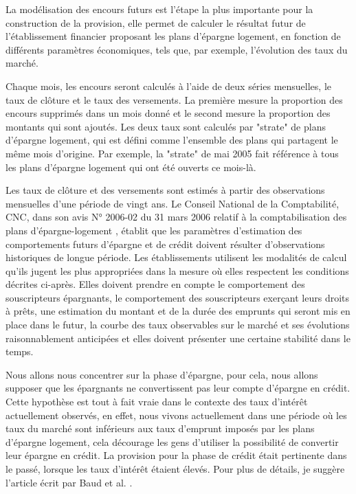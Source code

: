 \documentclass[12pt, a4paper]{book}
\begin{document}
La modélisation des encours futurs est l'étape la plus importante pour la construction de la provision, elle permet de calculer le résultat futur de l'établissement financier proposant les plans d'épargne logement, en fonction de différents paramètres économiques, tels que, par exemple, l'évolution des taux du marché. 

Chaque mois, les encours seront calculés à l'aide de deux séries mensuelles, le taux de clôture et le taux des versements. La première mesure la proportion des encours supprimés dans un mois donné et le second mesure la proportion des montants qui sont ajoutés. Les deux taux sont calculés par "strate" de plans d'épargne logement, qui est défini comme l'ensemble des plans qui partagent le même mois d'origine.
Par exemple, la "strate" de mai 2005 fait référence à tous les plans d'épargne logement qui ont été ouverts ce mois-là. 

Les taux de clôture et des versements sont estimés à partir des observations mensuelles d'une période de vingt ans. Le Conseil National de la Comptabilité, CNC, dans son avis N° 2006-02 du 31 mars 2006 relatif à la comptabilisation des plans d'épargne-logement \cite{CNC1}, établit que les paramètres d'estimation des comportements futurs d'épargne et de crédit doivent résulter d'observations historiques de longue période. Les établissements utilisent les modalités de calcul qu'ils jugent les plus appropriées dans la mesure où elles respectent les conditions décrites ci-après.
Elles doivent prendre en compte le comportement des souscripteurs épargnants, le comportement des souscripteurs exerçant leurs droits à prêts, une estimation du montant et de la durée des emprunts qui seront mis en place dans le futur, la courbe des taux observables sur le marché et ses évolutions raisonnablement anticipées et elles doivent présenter une certaine stabilité dans le temps.

Nous allons nous concentrer sur la phase d'épargne, pour cela, nous allons supposer que les épargnants ne convertissent pas leur compte d'épargne en crédit. Cette hypothèse est tout à fait vraie dans le contexte des taux d'intérêt actuellement observés, en effet, nous vivons actuellement dans une période où les taux du marché sont inférieurs aux taux d'emprunt imposés par les plans d'épargne logement, cela décourage les gens d'utiliser la possibilité de convertir leur épargne en crédit. La provision pour la phase de crédit était pertinente dans le passé, lorsque les taux d'intérêt étaient élevés. Pour plus de détails, je suggère l'article écrit par Baud et al. \cite{BetAl}.
\end{document}

